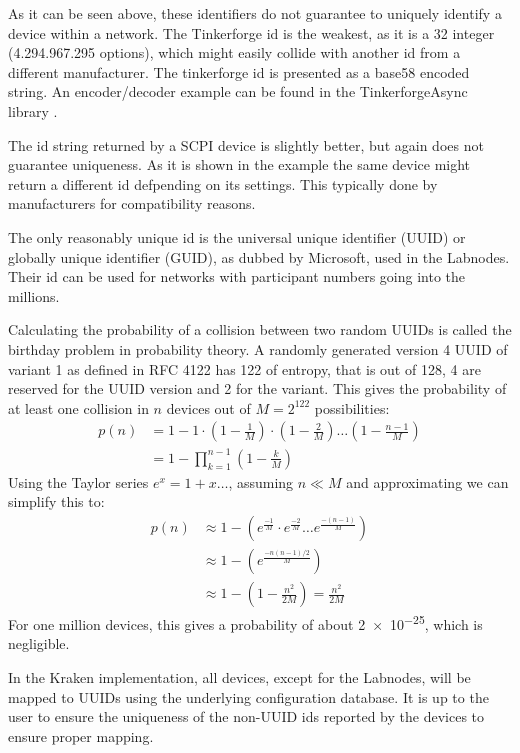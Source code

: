 As it can be seen above, these identifiers do not guarantee to uniquely identify a device within a network. The Tinkerforge id is the weakest, as it is a \qty{32}{\bit} integer (4.294.967.295 options), which might easily collide with another id from a different manufacturer. The tinkerforge id is presented as a base58 encoded string. An encoder/decoder example can be found in the TinkerforgeAsync library \cite{TinkerforgeAsync}.

The id string returned by a SCPI device is slightly better, but again does not guarantee uniqueness. As it is shown in the example the same device might return a different id defpending on its settings. This typically done by manufacturers for compatibility reasons.

The only reasonably unique id is the universal unique identifier (UUID) or globally unique identifier (GUID), as dubbed by Microsoft, used in the Labnodes. Their id can be used for networks with participant numbers going into the millions.

Calculating the probability of a collision between two random UUIDs is called the birthday problem \cite{BirthdayProblem} in probability theory. A randomly generated version 4 UUID of variant 1 as defined in RFC 4122 \cite{RFC-UUID} has \qty{122}{\bit} of entropy, that is out of \qty{128}{\bit}, \qty{4}{\bit} are reserved for the UUID version and \qty{2}{\bit} for the variant. This gives the probability of at least one collision in $n$ devices out of $M = 2^{122}$ possibilities:
\begin{align}
    p(n) &= 1 - 1 \cdot \left(1 - \frac{1}{M}\right) \cdot \left(1 - \frac{2}{M}\right) \dots \left(1 - \frac{n-1}{M}\right) \nonumber\\
    &= 1 - \prod_{k=1}^{n-1} \left(1 - \frac{k}{M} \right)
\end{align}
Using the Taylor series $e^x = 1+x \dots$, assuming $n \ll M$ and approximating we can simplify this to:
\begin{align}
    p(n) &\approx 1 - \left(e^\frac{-1}{M} \cdot e^\frac{-2}{M} \dots e^\frac{-(n-1)}{M} \right) \nonumber\\
    &\approx 1 - \left(e^\frac{-n(n-1)/2}{M} \right) \nonumber\\
    &\approx 1 - \left(1 - \frac{n^2}{2 M} \right) = \frac{n^2}{2 M}
\end{align}
For one million devices, this gives a probability of about \num{2e-25}, which is negligible.

In the Kraken implementation, all devices, except for the Labnodes, will be mapped to UUIDs using the underlying configuration database. It is up to the user to ensure the uniqueness of the non-UUID ids reported by the devices to ensure proper mapping.

